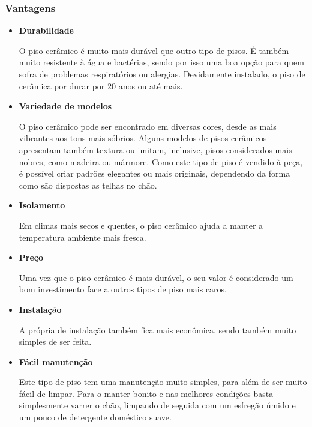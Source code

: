 \subsubsection*{\textbf{Vantagens}}

	\begin{itemize}

		\item \textbf{Durabilidade}
		
		O piso cerâmico é muito mais durável que outro tipo de pisos. É também muito resistente à água e bactérias, sendo por isso uma boa opção para quem sofra de problemas respiratórios ou alergias. Devidamente instalado, o piso de cerâmica por durar por 20 anos ou até mais.

		\item \textbf{Variedade de modelos}
		
		O piso cerâmico pode ser encontrado em diversas cores, desde as mais vibrantes aos tons mais sóbrios. Alguns modelos de pisos cerâmicos apresentam também textura ou imitam, inclusive, pisos considerados mais nobres, como madeira ou mármore. Como este tipo de piso é vendido à peça, é possível criar padrões elegantes ou mais originais, dependendo da forma como são dispostas as telhas no chão.

		\item \textbf{Isolamento}
		
		Em climas mais secos e quentes, o piso cerâmico ajuda a manter a temperatura ambiente mais fresca.

		\item \textbf{Preço}
		
		Uma vez que o piso cerâmico é mais durável, o seu valor é considerado um bom investimento face a outros tipos de piso mais caros.

		\item \textbf{Instalação}
		
		A própria de instalação também fica mais econômica, sendo também muito simples de ser feita.

		\item \textbf{Fácil manutenção}
		
		Este tipo de piso tem uma manutenção muito simples, para além de ser muito fácil de limpar. Para o manter bonito e nas melhores condições basta simplesmente varrer o chão, limpando de seguida com um esfregão úmido e um pouco de detergente doméstico suave.

	\end{itemize}

